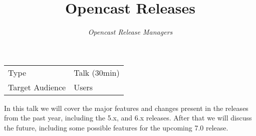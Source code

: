 \documentclass[a4paper]{article}
\title{Opencast Releases}
\author{\textit{Opencast Release Managers}}
\begin{document}
\maketitle

\begin{center}
\begin{tabular}{ll}
\toprule
	Type            & Talk (30min) \\
	Target Audience & Users \\
\bottomrule
\end{tabular}
\end{center}

\vspace{1em}

In this talk we will cover the major features and changes present in the
releases from the past year, including the 5.x, and 6.x releases.  After that we
will discuss the future, including some possible features for the upcoming 7.0
release.
\end{document}

